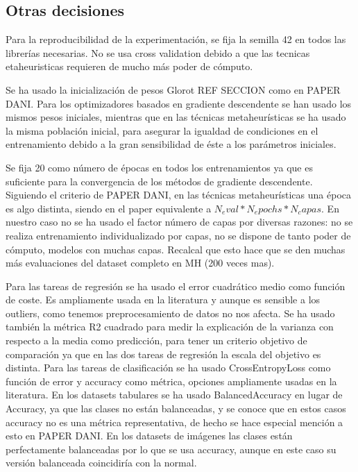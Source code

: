 \subsection{Otras decisiones}

Para la reproducibilidad de la experimentación, se fija la semilla 42 en todos las librerías necesarias. No se usa cross validation debido a que las tecnicas etaheuristicas requieren de mucho más poder de cómputo.

Se ha usado la inicialización de pesos Glorot REF SECCION como en PAPER DANI. Para los optimizadores basados en gradiente descendente se han usado los mismos pesos iniciales, mientras que en las técnicas metaheurísticas se ha usado la misma población inicial, para asegurar la igualdad de condiciones en el entrenamiento debido a la gran sensibilidad de éste a los parámetros iniciales. 

Se fija 20 como número de épocas en todos los entrenamientos ya que es suficiente para la convergencia de los métodos de gradiente descendente. Siguiendo el criterio de PAPER DANI, en las técnicas metaheurísticas una época es algo distinta, siendo en el paper equivalente a $N_eval * N_epochs * N_capas$. En nuestro caso no se ha usado el factor número de capas por diversas razones: no se realiza entrenamiento individualizado por capas, no se dispone de tanto poder de cómputo, modelos con muchas capas. Recalcal que esto hace que se den muchas más evaluaciones del dataset completo en MH (200 veces mas).

Para las tareas de regresión se ha usado el error cuadrático medio como función de coste. Es ampliamente usada en la literatura y aunque es sensible a los outliers, como tenemos preprocesamiento de datos no nos afecta. Se ha usado también la métrica R2 cuadrado para medir la explicación de la varianza con respecto a la media como predicción, para tener un criterio objetivo de comparación ya que en las dos tareas de regresión la escala del objetivo es distinta. Para las tareas de clasificación se ha usado CrossEntropyLoss como función de error y accuracy como métrica, opciones ampliamente usadas en la literatura. En los datasets tabulares se ha usado BalancedAccuracy en lugar de Accuracy, ya que las clases no están balanceadas, y se conoce que en estos casos accuracy no es una métrica representativa, de hecho se hace especial mención a esto en PAPER DANI. En los datasets de imágenes las clases están perfectamente balanceadas por lo que se usa accuracy, aunque en este caso su versión balanceada coincidiría con la normal.


